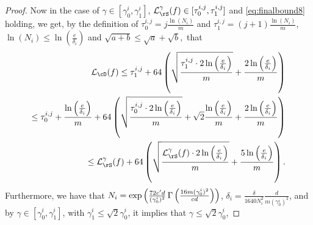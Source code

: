 \begin{proof}
      Now in the case of $\gamma \in \left[\gamma_{0}^{i},\gamma_{1}^{i}\right]$, $\ls_{\rS}^{\gamma}(f)\in [\tau_{0}^{i,j},\tau_{1}^{i,j}] $ and \cref{eq:finalbound8} holding, we get, by the definition of $ \tau_{0}^{i,j} =j\frac{\ln{\left(N_{i} \right)}}{m}$ and $ \tau_{1}^{i,j} =(j+1)\frac{\ln{\left(N_{i} \right)}}{m}$, $ \ln{\left(N_{i} \right)} \leq \ln{\left(\frac{e}{\delta_{i}} \right)}$ and $\sqrt{a+b}\leq \sqrt{a}+\sqrt{b},$ that 
      \begin{align}\label{eq:finalbound5}
        \ls_{\cD}(f)\leq 
        \tau_{1}^{i,j} 
        + \cc\left(\sqrt{\frac{\tau_{1}^{i,j}\cdot 2 \ln{\left(\frac{e}{\delta_{i}} \right)}}{m}} 
        +\frac{2\ln{\left(\frac{e}{\delta_{i}} \right)}}{m}\right)
        \\
        \leq 
        \tau_{0}^{i,j} +\frac{\ln{\left(\frac{e}{\delta_{i}} \right)}}{m}
        + \cc\left(\sqrt{\frac{\tau_{0}^{i,j}\cdot 2 \ln{\left(\frac{e}{\delta_{i}} \right)}}{m}}+ \sqrt{2}\frac{\ln{\left(\frac{e}{\delta_{i}} \right)}}{m}
        +\frac{2\ln{\left(\frac{e}{\delta_{i}} \right)}}{m}\right) \nonumber
        \\
        \leq \ls_{\rS}^{\gamma}(f)
        + \cc\left(\sqrt{\frac{\ls_{\rS}^{\gamma}(f)\cdot 2 \ln{\left(\frac{e}{\delta_{i}} \right)}}{m}}
        +\frac{5\ln{\left(\frac{e}{\delta_{i}} \right)}}{m}\right).\nonumber
      \end{align}
      Furthermore, we have that $ N_{i}= \exp{\left(\frac{72 c'd}{ (\gamma_{0}^{i})^{2}} \operatorname{\Gamma}{\left(  \frac{16m(\gamma_{0}^{i})^{2}}{cd} \right)} \right)}  $, $ \delta_{i}= \frac{\delta}{1640N_{i}^{2}} \frac{d}{m(\gamma_{0}^{i})^{2}}$, and by $ \gamma\in \left[\gamma_{0}^{i},\gamma_{1}^{i}\right]$, with $ \gamma_{1}^{i}\leq \sqrt{2}\gamma_{0}^{i} $, it implies that $ \gamma \leq \sqrt{2}\gamma_{0}^{i}$,

\end{proof}
